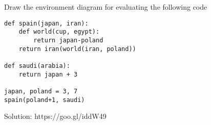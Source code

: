 \begin{blocksection}
\question Draw the environment diagram for evaluating the following code
\begin{lstlisting}
def spain(japan, iran):
    def world(cup, egypt):
	    return japan-poland
    return iran(world(iran, poland))

def saudi(arabia):
    return japan + 3
	
japan, poland = 3, 7
spain(poland+1, saudi)
\end{lstlisting}
\begin{solution}
Solution: 	https://goo.gl/iddW49
\end{solution}
\end{blocksection}